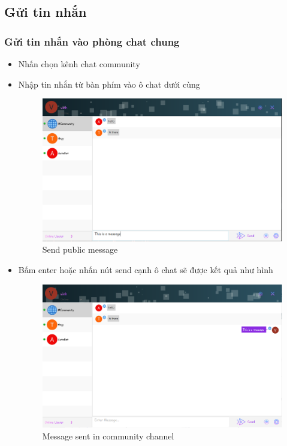 \documentclass[a4paper]{article}
\begin{document}
	\subsection{Gửi tin nhắn}
	\subsubsection{Gửi tin nhắn vào phòng chat chung}
	\begin{itemize}
		\item Nhấn chọn kênh chat community
		\newpage
		\item Nhập tin nhắn từ bàn phím vào ô chat dưới cùng
		\begin{figure}[h!]
			\centering
			\includegraphics[width=13cm]{enter-message.PNG}
			\caption{Send public message}
			\label{fig:my_label}
		\end{figure}
		\item Bấm enter hoặc nhấn nút send cạnh ô chat sẽ được kết quả như hình
		\begin{figure}[h!]
			\centering
			\includegraphics[width=13cm]{message-sent.PNG}
			\caption{Message sent in community channel}

\end{figure}
\end{itemize}
\end{document}

